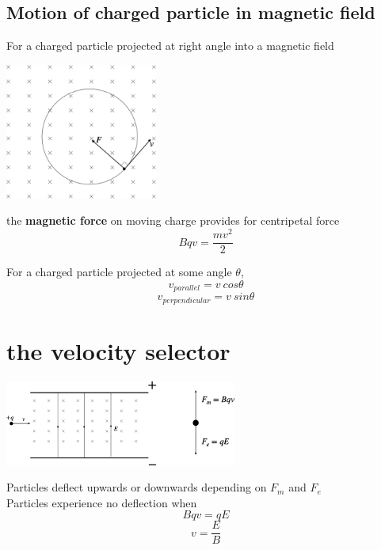 \documentclass[a4paper, 10pt]{article}
\begin{document}
\subsection{Motion of charged particle in magnetic field}
For a charged particle projected at right angle into a magnetic field \\
\begin{minipage}{0.5\textwidth}
   \begin{center}
      \includegraphics[width=5cm]{figures/8.pdf} 
   \end{center}	
\end{minipage}
\begin{minipage}{0.5\textwidth}
   the \textbf{magnetic force} on moving charge provides for centripetal force
   \[
      Bqv = \frac{mv^2}{2}
   \]
\end{minipage}

For a charged particle projected at some angle $\theta$, 
\[
   v_{parallel} = v\ cos\theta
\]
\[
   v_{perpendicular} = v\ sin \theta
\]


\section{the velocity selector}
\begin{center}
   \includegraphics[width=3in]{figures/9.pdf} 
\end{center}	
Particles deflect upwards or downwards depending on $F_m$ and $F_e$   \\

Particles experience no deflection when
\[
Bqv = qE
\]
\[
v = \frac{E}{B}
\]
\end{document}
